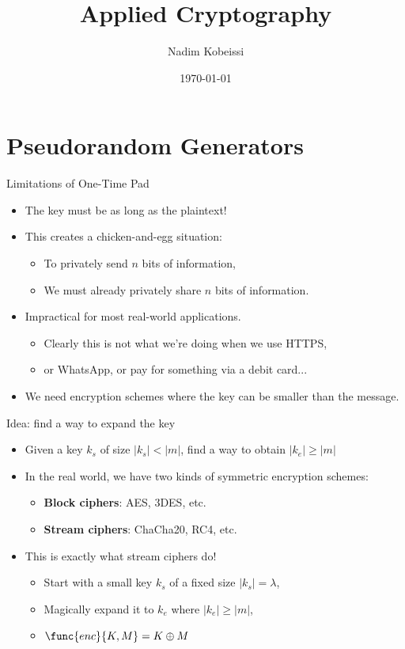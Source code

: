 \documentclass[aspectratio=169, lualatex, handout]{beamer}
\title{Applied Cryptography}
\author{Nadim Kobeissi}
\institute{American University of Beirut}
\date{\today}
\begin{document}
\begin{frame}[plain]
	\titlepage
\end{frame}

\section{Pseudorandom Generators}

\begin{frame}{Limitations of One-Time Pad}
	\begin{itemize}[<+->]
		\item The key must be as long as the plaintext!
		\item This creates a chicken-and-egg situation:
		      \begin{itemize}[<+->]
			      \item To privately send $n$ bits of information,
			      \item We must already privately share $n$ bits of information.
		      \end{itemize}
		\item Impractical for most real-world applications.
		      \begin{itemize}[<+->]
			      \item Clearly this is not what we're doing when we use HTTPS,
			      \item or WhatsApp, or pay for something via a debit card...
		      \end{itemize}
		\item We need encryption schemes where the key can be smaller than the message.
	\end{itemize}
\end{frame}

\begin{frame}{Idea: find a way to expand the key}
	\begin{itemize}[<+->]
		\item Given a key $k_s$ of size $\left|k_s\right| < \left|m\right|$, find a way to obtain $\left|k_e\right| \geq \left|m\right|$
		\item In the real world, we have two kinds of symmetric encryption schemes:
		      \begin{itemize}[<+->]
			      \item \textbf{Block ciphers}: AES, 3DES, etc.
			      \item \textbf{Stream ciphers}: ChaCha20, RC4, etc.
		      \end{itemize}
		\item This is exactly what stream ciphers do!
		      \begin{itemize}[<+->]
			      \item Start with a small key $k_s$ of a fixed size $\left|k_s\right| = \lambda$,
			      \item Magically expand it to $k_e$ where $\left|k_e\right| \geq \left|m\right|$,
			      \item $\func{enc}{K, M} = K \oplus M$
		      \end{itemize}
	\end{itemize}
\end{frame}
\end{document}
